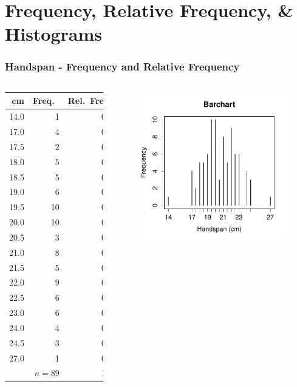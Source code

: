 \section{Frequency, Relative Frequency, \& Histograms}
\begin{frame}
\frametitle{Handspan - Frequency and Relative Frequency}
\footnotesize
\singlespacing


\begin{columns}
\begin{tabular}{rrr}
cm& Freq.\ & Rel.\ Freq.\ \\
\hline
14.0         & 1 &0.01\\
17.0         & 4 &0.05\\
17.5      &  2 &0.02\\
18.0         & 5 &0.06\\
18.5      &  5 &0.06\\
19.0         & 6 &0.07\\
19.5      & 10 &0.11\\
20.0        & 10 &0.11\\
20.5      &  3 &0.03\\
21.0         & 8 &0.09\\
21.5      &  5 &0.06\\
22.0         & 9 &0.10\\
22.5      &  6 &0.07\\
23.0         & 6 &0.07\\
24.0         & 4 &0.05\\
24.5      &  3 &0.03\\
27.0         & 1 &0.01\\
\hline
& $n=89$&1.00
\end{tabular}
\begin{figure}
	\centering
	\includegraphics[scale = 0.55]{./images/handspan_freq}
\end{figure}
\end{columns}
\end{frame}

